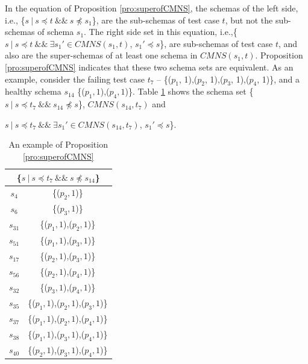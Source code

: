 In the equation of Proposition \ref{pro:superofCMNS}, the schemas of the left side, i.e., \{$s\ |\ s \preceq t\ \&\&\ s \npreceq s_{1}$\}, are the sub-schemas of test case $t$, but not the sub-schemas of schema $s_{1}$. The right side set in this equation, i.e.,\{$ s\ |\ s \preceq t \  \&\& \ \exists s_{1}' \in CMNS(s_{1}, t)$, $s_{1}' \preceq s$\}, are sub-schemas of test case $t$, and also are the super-schemas of at least one schema in $CMNS(s_{1}, t)$. Proposition \ref{pro:superofCMNS} indicates that these two schema sets are equivalent. As an example, consider the failing test case $t_{7}$ -- \{($p_{1}$, 1),($p_{2}$, 1),($p_{3}$, 1),($p_{4}$, 1)\}, and a healthy schema $s_{14}$ \{($p_{1}, 1$),($p_{4}, 1$)\}. Table \ref{examleOfCMNSPro} shows the schema set  \{$s\ |\ s \preceq t_{7}\ \&\&\ s_{14} \npreceq s$\}, $CMNS(s_{14}, t_{7})$ and {$ s\ |\ s \preceq t_{7}\ \&\& \ \exists s_{1}' \in CMNS(s_{14}, t_{7})$, $s_{1}' \preceq s$\}.

 \begin{table}[htbp]
  \centering
  \caption{An example of Proposition \ref{pro:superofCMNS}}
  \label{examleOfCMNSPro}
    \begin{tabular}{|c|c|} \hline
     \multicolumn{2}{|c|}{\{$s\ |\ s \preceq t_{7}\ \&\&\ s \npreceq s_{14}$\}} \\ \hline
   $s_{4}$ & \{($p_{2}, 1$)\} \\
   $s_{6}$ & \{($p_{3}, 1$)\} \\

   $s_{31}$ & \{($p_{1}, 1$),($p_{2}, 1$)\} \\
   $s_{51}$ & \{($p_{1}, 1$),($p_{3}, 1$)\} \\
   $s_{17}$ & \{($p_{2}, 1$),($p_{3}, 1$)\} \\
   $s_{56}$ & \{($p_{2}, 1$),($p_{4}, 1$)\} \\
   $s_{32}$ & \{($p_{3}, 1$),($p_{4}, 1$)\} \\

   $s_{35}$ & \{($p_{1}, 1$),($p_{2}, 1$),($p_{3}, 1$)\} \\
   $s_{37}$ & \{($p_{1}, 1$),($p_{2}, 1$),($p_{4}, 1$)\} \\
   $s_{38}$ & \{($p_{1}, 1$),($p_{3}, 1$),($p_{4}, 1$)\} \\
   $s_{40}$ & \{($p_{2}, 1$),($p_{3}, 1$),($p_{4}, 1$)\} \\


\end{tabular}
\end{table}}
